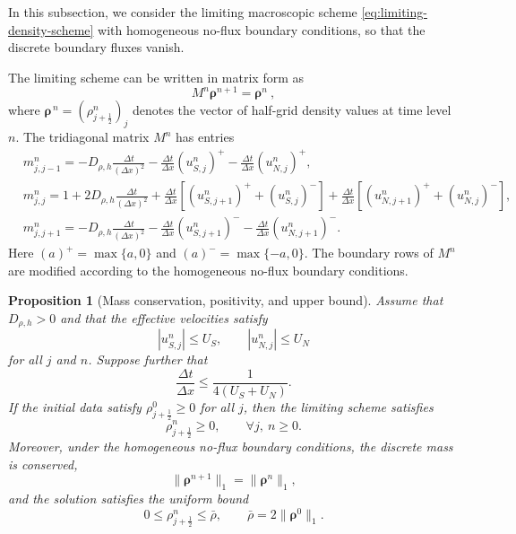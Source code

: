 \documentclass[11pt,twoside]{article}
\numberwithin{equation}{section}
\theoremstyle{plain}
\newtheorem{proposition}[theorem]{Proposition}
\theoremstyle{nonumberplain}
\newcommand{\brho}{\boldsymbol{\rho}}
\begin{document}
{{In this subsection, we consider the limiting macroscopic scheme \eqref{eq:limiting-density-scheme} with
homogeneous no-flux boundary conditions, so that the discrete boundary
fluxes vanish.


The limiting scheme can be written in matrix form as
\[
M^n\brho^{n+1}=\brho^n \ ,
\]
where
 $\boldsymbol{\rho}^{\,n}
=
(\rho_{j+\frac12}^n)_j$
denotes the vector of half-grid density values at time level $n$.
The tridiagonal matrix $M^n$ has entries
\begin{align*}
&m_{j,j-1}^n
=
-D_{\rho,h}\frac{\Delta t}{(\Delta x)^2}
-\frac{\Delta t}{\Delta x}(u_{S,j}^n)^+
-\frac{\Delta t}{\Delta x}(u_{N,j}^n)^+,\\
&m_{j,j}^n
=
1+2D_{\rho,h}\frac{\Delta t}{(\Delta x)^2}
+\frac{\Delta t}{\Delta x}
\left[(u_{S,j+1}^n)^+ +(u_{S,j}^n)^-\right]
+\frac{\Delta t}{\Delta x}
\left[(u_{N,j+1}^n)^+ +(u_{N,j}^n)^-\right],\\
&m_{j,j+1}^n
=
-D_{\rho,h}\frac{\Delta t}{(\Delta x)^2}
-\frac{\Delta t}{\Delta x}(u_{S,j+1}^n)^-
-\frac{\Delta t}{\Delta x}(u_{N,j+1}^n)^- .
\end{align*}
Here $(a)^+=\max\{a,0\}$ and $(a)^-=\max\{-a,0\}$.
The boundary rows of \(M^n\) are modified according to the homogeneous
no-flux boundary conditions.


\begin{proposition}[Mass conservation, positivity, and upper bound]
Assume that $D_{\rho,h}>0$ and that the effective velocities satisfy
\[
|u_{S,j}^n|\le U_S,\qquad |u_{N,j}^n|\le U_N
\]
for all $j$ and $n$. Suppose further that
\begin{equation}\label{eq:CFL-bound-new}
\frac{\Delta t}{\Delta x}
\le
\frac{1}{4(U_S+U_N)} .
\end{equation}
If the initial data satisfy $\rho_{j+\frac12}^0\ge0$ for all $j$, then the
limiting scheme satisfies
\[
\rho_{j+\frac12}^n\ge0,\qquad \forall j,\ n\ge0.
\]
Moreover, under the homogeneous no-flux boundary conditions, the discrete
mass is conserved,
\[
\|\brho^{n+1}\|_1=\|\brho^n\|_1,
\]
and the solution satisfies the uniform bound
\[
0\le \rho_{j+\frac12}^n\le \bar\rho,\qquad
\bar\rho=2\|\brho^0\|_1 .
\]
\end{proposition}

}}
\end{document}
